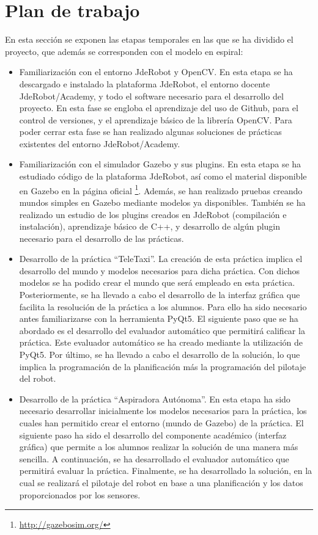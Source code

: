 \section{Plan de trabajo}
En esta sección se exponen las etapas temporales en las que se ha dividido el proyecto, que además se corresponden con el modelo en espiral:

\begin{itemize}
\item Familiarización con el entorno JdeRobot y OpenCV. En esta etapa se ha descargado e instalado la plataforma JdeRobot, el entorno docente JdeRobot/Academy, y todo el software necesario para el desarrollo del proyecto. En esta fase se engloba el aprendizaje del uso de Github, para el control de versiones, y el aprendizaje básico de la librería OpenCV. Para poder cerrar esta fase se han realizado algunas soluciones de prácticas existentes del entorno JdeRobot/Academy.
\item Familiarización con el simulador Gazebo y sus plugins. En esta etapa se ha estudiado código de la plataforma JdeRobot, así como el material disponible en Gazebo en la página oficial \footnote{\url{http://gazebosim.org/}}.  Además, se han realizado pruebas creando mundos simples en Gazebo mediante modelos ya disponibles. También se ha realizado un estudio de los plugins creados en JdeRobot (compilación e instalación), aprendizaje básico de C++, y desarrollo de algún plugin necesario para el desarrollo de las prácticas.
\item Desarrollo de la práctica ``TeleTaxi''. La creación de esta práctica implica el desarrollo del mundo y modelos necesarios para dicha práctica. Con dichos modelos se ha podido crear el mundo que será empleado en esta práctica. Posteriormente, se ha llevado a cabo el desarrollo de la interfaz gráfica que facilita la resolución de la práctica a los alumnos. Para ello ha sido necesario antes familiarizarse con la herramienta PyQt5. El siguiente paso que se ha abordado es el desarrollo del evaluador automático que permitirá calificar la práctica. Este evaluador automático se ha creado mediante la utilización de PyQt5. Por último, se ha llevado a cabo el desarrollo de la solución, lo que implica la programación de la planificación más la programación del pilotaje del robot.
\item Desarrollo de la práctica ``Aspiradora Autónoma''. En esta etapa ha sido necesario desarrollar inicialmente los modelos necesarios para la práctica, los cuales han permitido crear el entorno (mundo de Gazebo) de la práctica. El siguiente paso ha sido el desarrollo del componente académico (interfaz gráfica) que permite a los alumnos realizar la solución de una manera más sencilla. A continuación, se ha desarrollado el evaluador automático que permitirá evaluar la práctica. Finalmente, se ha desarrollado la solución, en la cual se realizará el pilotaje del robot en base a una planificación y los datos proporcionados por los sensores.

\end{itemize}
